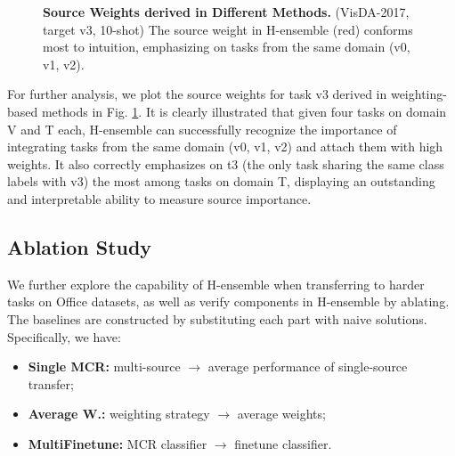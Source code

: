 \documentclass[letterpaper]{article} %
\begin{document}

\begin{figure}[ht]
    \centering
    \centerline{}
    \caption{\textbf{Source Weights derived in Different Methods.} (VisDA-2017, target v3, 10-shot) The source weight in H-ensemble (red) conforms most to intuition, emphasizing on tasks from the same domain (v0, v1, v2).}
    \label{fig:weight}
\end{figure}

For further analysis, we plot the source weights for task v3 derived in weighting-based methods in Fig. \ref{fig:weight}. It is clearly illustrated that given four tasks on domain V and T each, H-ensemble can successfully recognize the importance of integrating tasks from the same domain (v0, v1, v2) and attach them with high weights. It also correctly emphasizes on t3 (the only task sharing the same class labels with v3) the most among tasks on domain T, displaying an outstanding and interpretable ability to measure source importance.








\subsection{Ablation Study}

We further explore the capability of H-ensemble when transferring to harder tasks on Office datasets, as well as verify components in H-ensemble by ablating. The baselines are constructed by substituting each part with naive solutions. Specifically, we have: 
\begin{itemize}
    \item \textbf{Single MCR:} multi-source $\to$ average performance of single-source transfer; 
    \item \textbf{Average W.:} weighting strategy $\to$ average weights; \
    \item \textbf{MultiFinetune:} MCR classifier $\to$ finetune classifier.
\end{itemize}
\end{document}
